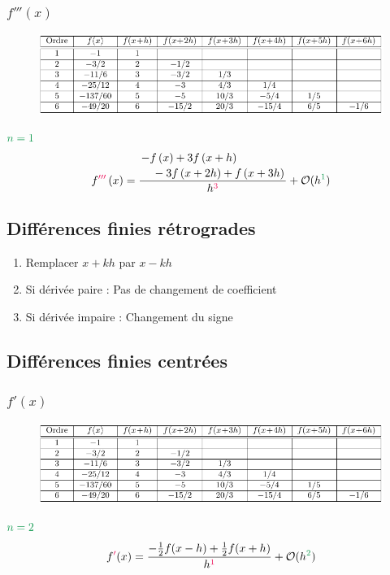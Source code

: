 \documentclass[]{article}
\begin{document}
\begin{multicols}{3}
\subsubsection{$f'''(x)$}
\begin{figure}[H]
\centering
\includegraphics[width=\columnwidth,page=3]{diff_finies_tableaux.pdf}
\end{figure}
$\textcolor{ForestGreen}{n=1}$
$$f\textcolor{OrangeRed}{'''}\left(x\right)=\frac{\splitdfrac{-f\left(x\right)+3f\left(x+h\right)}{-3f\left(x+2h\right)+f\left(x+3h\right)}}{h^{\textcolor{OrangeRed}{3}}}+\mathcal{O}(h^{\textcolor{ForestGreen}{1}})$$
\subsection{Différences finies rétrogrades}
\begin{enumerate}
\item Remplacer $x+kh$ par $x-kh$
\item Si dérivée paire : Pas de changement de coefficient
\item Si dérivée impaire : Changement du signe
\end{enumerate}
\subsection{Différences finies centrées}
\subsubsection{$f'(x)$}
\begin{figure}[H]
\centering
\includegraphics[width=\columnwidth,page=5]{diff_finies_tableaux.pdf}
\end{figure}
$\textcolor{ForestGreen}{n=2}$
$$f\textcolor{OrangeRed}{'}(x)=\frac{-\frac{1}{2}f(x-h)+\frac{1}{2}f(x+h)}{h^{\textcolor{OrangeRed}{1}}}+\mathcal{O}(h^{\textcolor{ForestGreen}{2}})$$

\end{multicols}
\end{document}
